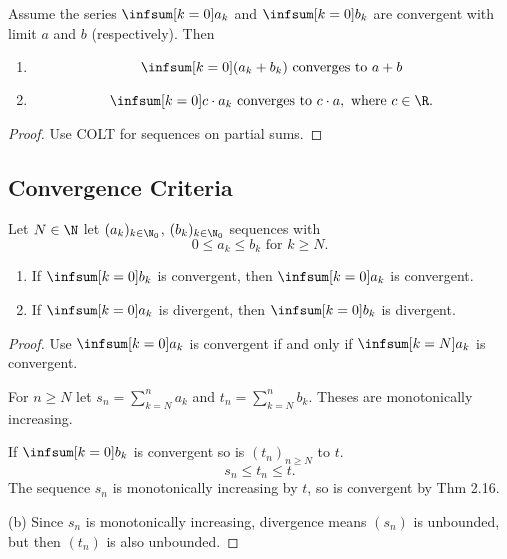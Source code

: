 \documentclass[10pt, a4paper]{article}
\begin{document}
\begin{theorem}
    Assume the series $\infsum[k = 0]a_k$ and $\infsum[k = 0]b_k$ are convergent with limit $a$ and $b$
    (respectively).
    Then
    \begin{enumerate}[label = (\alph*)]
        \item
        \[
        \infsum[k = 0](a_k + b_k) \text{ converges to } a + b
        \]
        \item
        \[
        \infsum[k = 0]c\cdot a_k\text{ converges to } c \cdot a, \text{ where } c \in \R.
        \]
    \end{enumerate}
    \begin{proof}
        Use COLT for sequences on partial sums.
    \end{proof}
\end{theorem}

\subsection{Convergence Criteria}
\begin{theorem}
    Let $N \in \N$ let $(a_k)_{k \in \N_0}$, $(b_k)_{k \in \N_0}$ sequences with
    \[
    0 \leq a_k \leq b_k \text{ for } k \geq N.
    \]
    \begin{enumerate}[label = (\alph*)]
        \item If $\infsum[k = 0]b_k$ is convergent,
        then $\infsum[k = 0]a_k$ is convergent.
        \item If $\infsum[k = 0]a_k$ is divergent,
        then $\infsum[k = 0]b_k$ is divergent.
    \end{enumerate}
    \begin{proof}
        Use $\infsum[k = 0]a_k$ is convergent if and only if $\infsum[k = N]a_k$ is convergent.

        For $n \geq N$ let $s_n = \sum_{k = N}^{n}a_k$ and $t_n = \sum_{k = N}^{n}b_k$.
        Theses are monotonically increasing.

        If $\infsum[k = 0]b_k$ is convergent so is $(t_n)_{n \geq N}$ to $t$.
        \[
        s_n \leq t_n \leq t.
        \]
        The sequence $s_n$ is monotonically increasing by $t$,
        so is convergent by Thm 2.16.

        (b)
        Since $s_n$ is monotonically increasing,
        divergence means $(s_n)$ is unbounded,
        but then $(t_n)$ is also unbounded.
    \end{proof}
\end{theorem}
\end{document}
